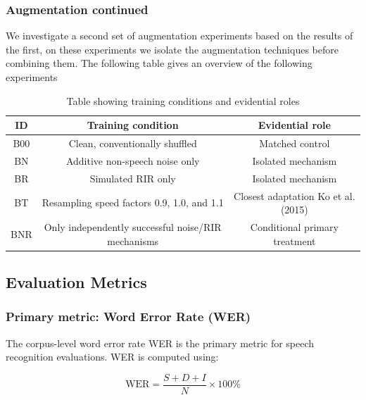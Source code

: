 {\subsubsection{Augmentation continued} 

We investigate a second set of augmentation experiments based on the results of the first, on these experiments we isolate the augmentation techniques before combining them. The following table gives an overview of the following experiments



\begin{table}[htbp]
    \centering
    \begin{tabular}{|c|c|c|}
        \hline
        ID & Training condition & Evidential role \\
        \hline
        B00 & Clean, conventionally shuffled & Matched control \\
        \hline
        BN & Additive non-speech noise only & Isolated mechanism \\
        \hline
        BR & Simulated RIR only & Isolated mechanism \\
        \hline
        BT & Resampling speed factors 0.9, 1.0, and 1.1 & Closest adaptation Ko et al. (2015) \\
        \hline
        BNR & Only independently successful noise/RIR mechanisms & Conditional primary treatment \\
        \hline
    \end{tabular}
    \caption{Table showing training conditions and evidential roles}
    \label{tab:training_conditions}
\end{table}

\subsection{Evaluation Metrics}
\label{sec:evaluation}

\subsubsection{Primary metric: Word Error Rate (WER)}

The corpus-level word error rate WER is the primary metric for speech recognition evaluations. WER is computed using:

\begin{equation}
\text{WER} = \frac{S + D + I}{N} \times 100\%
\end{equation}

}

